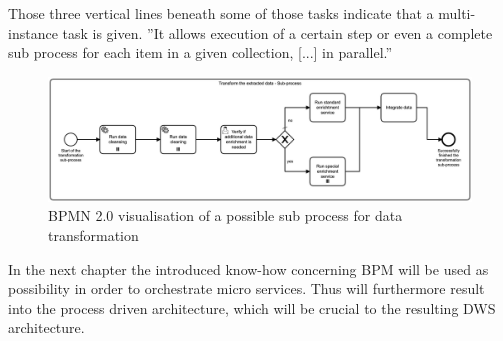 Those three vertical lines beneath some of those tasks indicate that a multi-instance task is given. ''It allows execution of a certain step or even a complete sub process for each item in a given collection, [...] in parallel.'' \cite{bpmMultiInstance} \newline
\begin{figure}[!htb]
    \centering
    \includegraphics[scale=0.13]{pictures/DataTransformationSubprocess.png}
    \caption{BPMN 2.0 visualisation of a possible sub process for data transformation}
    \label{fig:BPMNdatatransformation}
\end{figure}

In the next chapter the introduced know-how concerning BPM will be used as possibility in order to orchestrate micro services. Thus will furthermore result into the process driven architecture, which will be crucial to the resulting DWS architecture.

